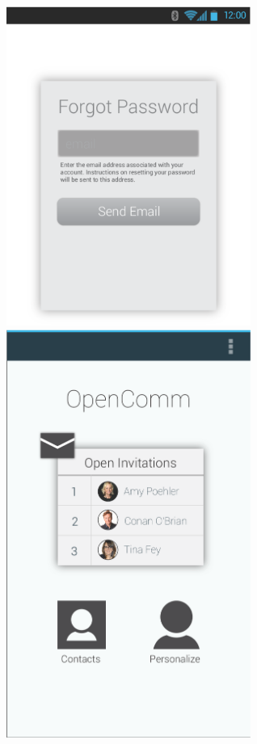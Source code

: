 \documentclass[12pt, letterpaper]{article}
\begin{document}
\begin{center}
\includegraphics[width=0.6\textwidth]{Forgot_Password.eps}
\clearpage
\includegraphics[width=0.6\textwidth]{Dashboard_new.eps}
\clearpage

\end{center}
\end{document}
